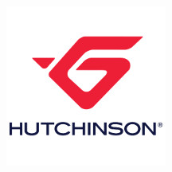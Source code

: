 \documentclass{beamer}
\begin{document}
\begin{frame}
{\begin{minipage}{.195\textwidth}
    \end{minipage}%
    \begin{minipage}{.195\textwidth}
        \centering
        \includegraphics[width=.6\linewidth]{img/new_images/hutchinson.png}
    \end{minipage}
    \vspace{0.5cm}
    }
    
    \end{frame}
    
\end{document}
